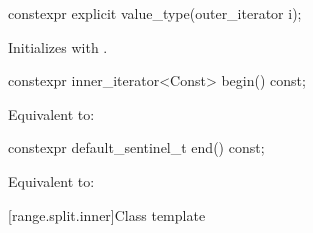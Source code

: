 %
\begin{itemdecl}
constexpr explicit value_type(outer_iterator i);
\end{itemdecl}

\begin{itemdescr}
\pnum
\effects Initializes  with .
\end{itemdescr}

%
\begin{itemdecl}
constexpr inner_iterator<Const> begin() const;
\end{itemdecl}

\begin{itemdescr}
\pnum
\effects Equivalent to: 
\end{itemdescr}

%
\begin{itemdecl}
constexpr default_sentinel_t end() const;
\end{itemdecl}

\begin{itemdescr}
\pnum
\effects Equivalent to: 
\end{itemdescr}

[range.split.inner]{Class template }

